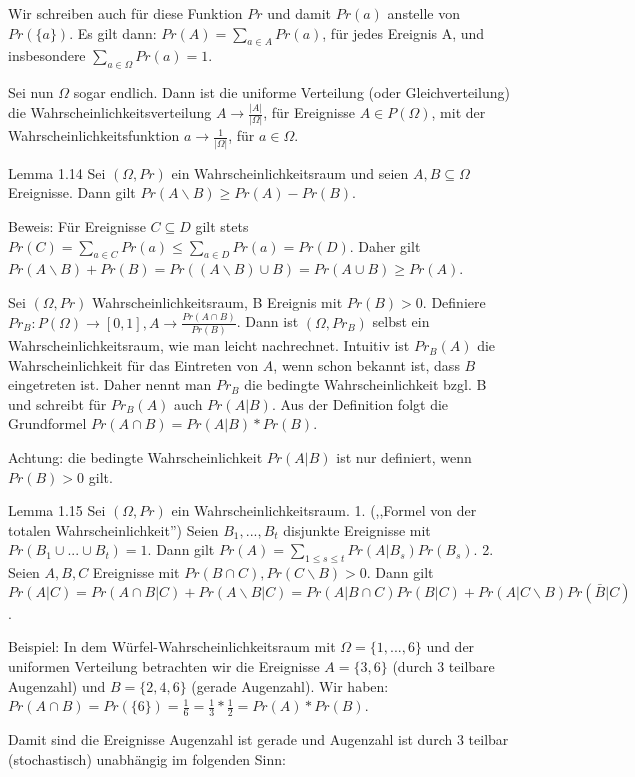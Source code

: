 \documentclass[a4paper]{article}
\begin{document}
\begin{multicols}{3}
Wir schreiben auch für diese Funktion $Pr$ und damit $Pr(a)$ anstelle von $Pr(\{a\})$. Es gilt dann: $Pr(A)=\sum_{a\in A} Pr(a)$, für jedes Ereignis A, und insbesondere $\sum_{a\in\Omega}Pr(a) = 1$.

Sei nun $\Omega$ sogar endlich. Dann ist die uniforme Verteilung (oder Gleichverteilung) die  Wahrscheinlichkeitsverteilung $A\rightarrow\frac{|A|}{|\Omega|}$, für Ereignisse $A\in P(\Omega)$, mit der Wahrscheinlichkeitsfunktion $a\rightarrow \frac{1}{|\Omega|}$, für $a\in\Omega$.

Lemma 1.14 Sei $(\Omega,Pr)$ ein Wahrscheinlichkeitsraum und seien $A,B\subseteq\Omega$ Ereignisse. Dann gilt $Pr(A\backslash B)\geq Pr(A)-Pr(B)$.

Beweis: Für Ereignisse $C\subseteq D$ gilt stets $Pr(C)=\sum_{a\in C} Pr(a)\leq \sum_{a\in D} Pr(a) = Pr(D)$.
Daher gilt $Pr(A\backslash B) + Pr(B) = Pr((A\backslash B)\cup B) = Pr(A\cup B)\geq Pr(A)$.

Sei $(\Omega,Pr)$ Wahrscheinlichkeitsraum, B Ereignis mit $Pr(B)> 0$. Definiere $Pr_B:P(\Omega)\rightarrow[0,1],A \rightarrow\frac{Pr(A\cap B)}{Pr(B)}$.
Dann ist $(\Omega,Pr_B)$ selbst ein Wahrscheinlichkeitsraum, wie man leicht nachrechnet. Intuitiv ist $Pr_B(A)$ die Wahrscheinlichkeit für das Eintreten von $A$, wenn schon bekannt ist, dass $B$ eingetreten ist. Daher nennt man $Pr_B$ die bedingte Wahrscheinlichkeit bzgl. B und schreibt für $Pr_B(A)$ auch $Pr(A|B)$. Aus der Definition folgt die Grundformel $Pr(A\cap B) = Pr(A|B)*Pr(B)$.

Achtung: die bedingte Wahrscheinlichkeit $Pr(A|B)$ ist nur definiert, wenn $Pr(B)> 0$ gilt.

Lemma 1.15 Sei $(\Omega,Pr)$ ein Wahrscheinlichkeitsraum.
1. (,,Formel von der totalen Wahrscheinlichkeit'') Seien $B_1,...,B_t$ disjunkte Ereignisse mit $Pr(B_1\cup...\cup B_t)=1$. Dann gilt $Pr(A)=\sum_{1\leq s\leq t} Pr(A|B_s)Pr(B_s)$.
2. Seien $A,B,C$ Ereignisse mit $Pr(B\cap C),Pr(C\backslash B)>0$. Dann gilt $Pr(A|C)=Pr(A\cap B | C) + Pr(A\backslash B|C)= Pr(A|B\cap C)Pr(B|C) + Pr(A|C\backslash B)Pr(\bar{B}|C)$.

Beispiel: In dem Würfel-Wahrscheinlichkeitsraum mit $\Omega=\{1,...,6\}$ und der uniformen Verteilung betrachten wir die Ereignisse $A=\{3,6\}$ (durch 3 teilbare Augenzahl) und $B=\{2,4,6\}$ (gerade Augenzahl). Wir haben: $Pr(A\cap B) = Pr(\{6\})=\frac{1}{6}=\frac{1}{3}*\frac{1}{2}=Pr(A)*Pr(B)$.

Damit sind die Ereignisse {Augenzahl ist gerade} und {Augenzahl ist durch 3 teilbar} (stochastisch) unabhängig im folgenden Sinn:


\end{multicols}
\end{document}
